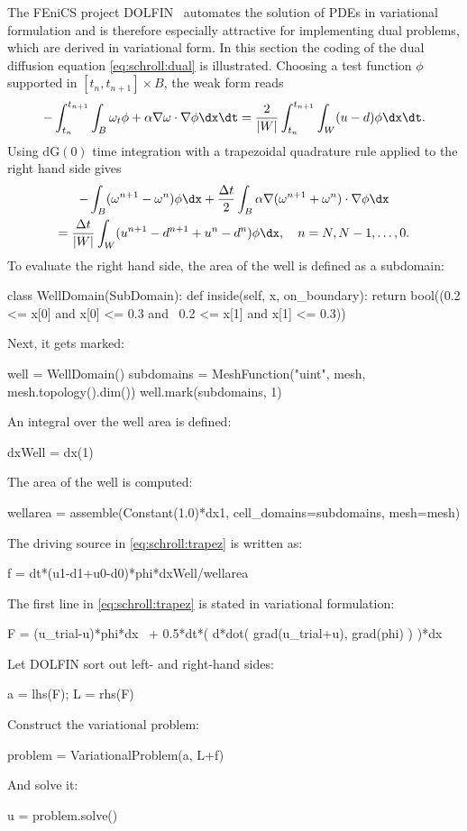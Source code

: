 The FEniCS project DOLFIN~\citep{LoggWells2010} automates the solution
of PDEs in variational formulation and is therefore especially
attractive for implementing dual problems, which are derived in
variational form.  In this section the coding of the dual diffusion
equation
\eqref{eq:schroll:dual} is illustrated.
Choosing a test function $\phi$ supported in $[t_n, t_{n+1}] \times B$,
the weak form reads
\begin{equation}
 - \int_{t_n}^{t_{n+1}} \int_B \omega_t \phi + \alpha \nabla \omega \cdot \nabla \phi \dx \dt =
 \frac{2}{|W|} \int_{t_n}^{t_{n+1}} \int_W (u-d) \phi \dx \dt.
\end{equation}
Using $\mathrm{dG}(0)$ time integration with a trapezoidal quadrature rule applied to the right hand side gives
\begin{multline} \label{eq:schroll:trapez}
 - \int_B (\omega^{n+1}-\omega^n) \phi \dx
     + \frac{\Delta t}{2} \int_B \alpha \nabla(\omega^{n+1}+\omega^n) \cdot \nabla \phi \dx
\\
 = \frac{\Delta t}{|W|} \int_W (u^{n+1} - d^{n+1} +u^n -d^n) \phi \dx,
 \quad n = N, N-1,\ldots, 0 .
\end{multline}
To evaluate the right hand side, the area of the well is defined as a subdomain:
\begin{python}
 class WellDomain(SubDomain):
     def inside(self, x, on_boundary):
         return bool((0.2 <= x[0] and x[0] <= 0.3 and \
                      0.2 <= x[1] and x[1] <= 0.3))
\end{python}
Next, it gets marked:
\begin{python}
 well = WellDomain()
 subdomains = MeshFunction("uint", mesh, mesh.topology().dim())
 well.mark(subdomains, 1)
\end{python}
An integral over the well area is defined:
\begin{python}
 dxWell = dx(1)
\end{python}
The area of the well is computed:
\begin{python}
wellarea = assemble(Constant(1.0)*dx1, cell_domains=subdomains, mesh=mesh)
\end{python}
The driving source in \eqref{eq:schroll:trapez} is written as:
\begin{python}
 f = dt*(u1-d1+u0-d0)*phi*dxWell/wellarea
\end{python}
The first line in \eqref{eq:schroll:trapez} is stated in variational formulation:
\begin{python}
 F = (u_trial-u)*phi*dx \
   + 0.5*dt*( d*dot( grad(u_trial+u), grad(phi) ) )*dx
\end{python}
Let DOLFIN sort out left- and right-hand sides:
\begin{python}
 a = lhs(F); L = rhs(F)
\end{python}
Construct the variational problem:
\begin{python}
 problem = VariationalProblem(a, L+f)
\end{python}
And solve it:
\begin{python}
 u = problem.solve()
\end{python}

